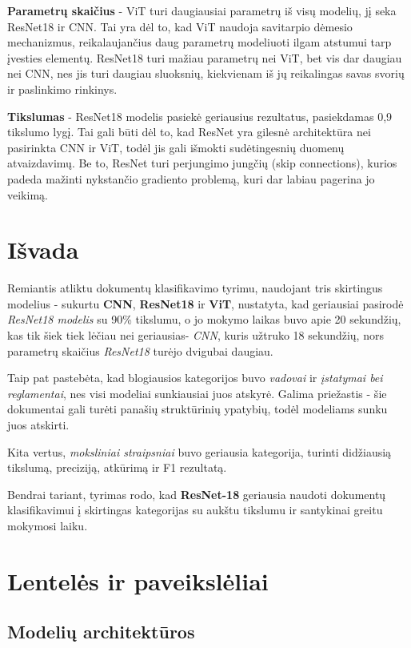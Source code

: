 \documentclass[conference]{IEEEtran}
\begin{document}
\textbf{Parametrų skaičius} - ViT turi daugiausiai parametrų iš visų modelių, jį seka ResNet18 ir CNN. Tai yra dėl to, kad ViT naudoja savitarpio dėmesio mechanizmus, reikalaujančius daug parametrų modeliuoti ilgam atstumui tarp įvesties elementų. ResNet18 turi mažiau parametrų nei ViT, bet vis dar daugiau nei CNN, nes jis turi daugiau sluoksnių, kiekvienam iš jų reikalingas savas svorių ir paslinkimo rinkinys.

\textbf{Tikslumas} - ResNet18 modelis pasiekė geriausius rezultatus, pasiekdamas 0,9 tikslumo lygį. Tai gali būti dėl to, kad ResNet yra gilesnė architektūra nei pasirinkta CNN ir ViT, todėl jis gali išmokti sudėtingesnių duomenų atvaizdavimų. Be to, ResNet turi perjungimo jungčių (skip connections), kurios padeda mažinti nykstančio gradiento problemą, kuri dar labiau pagerina jo veikimą.



\section{Išvada}
Remiantis atliktu dokumentų klasifikavimo tyrimu, naudojant tris skirtingus modelius - sukurtu \textbf{CNN}, \textbf{ResNet18} ir \textbf{ViT}, nustatyta, kad geriausiai pasirodė \textit{ResNet18 modelis} su 90\% tikslumu, o jo mokymo laikas buvo apie 20 sekundžių, kas tik šiek tiek lėčiau nei geriausias- \textit{CNN}, kuris užtruko 18 sekundžių, nors parametrų skaičius \textit{ResNet18} turėjo dvigubai daugiau. 

Taip pat pastebėta, kad blogiausios kategorijos buvo \textit{vadovai} ir \textit{įstatymai bei reglamentai}, nes visi modeliai sunkiausiai juos atskyrė. Galima priežastis - šie dokumentai gali turėti panašių struktūrinių ypatybių, todėl modeliams sunku juos atskirti.

Kita vertus, \textit{moksliniai straipsniai} buvo geriausia kategorija, turinti didžiausią tikslumą, preciziją, atkūrimą ir F1 rezultatą. 

Bendrai tariant, tyrimas rodo, kad \textbf{ResNet-18} geriausia naudoti dokumentų klasifikavimui į skirtingas kategorijas su aukštu tikslumu ir santykinai greitu mokymosi laiku.

\section{Lentelės ir paveikslėliai}

\subsection{Modelių architektūros}
\end{document}
